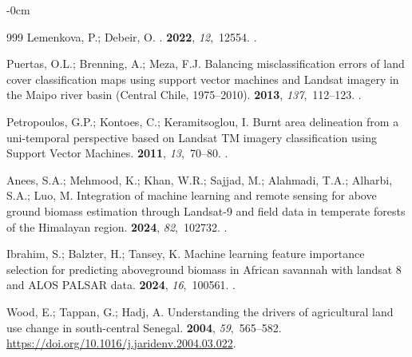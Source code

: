 \documentclass[earth,article,accept,pdftex,moreauthors]{Definitions/mdpi}
\begin{document}
{\begin{adjustwidth}{-\extralength}{0cm}
\begin{thebibliography}{999}
Lemenkova, P.; Debeir, O.
.
 {\bf 2022}, {\em 12},~12554.
.

Puertas, O.L.; Brenning, A.; Meza, F.J.
\newblock Balancing misclassification errors of land cover classification maps
  using support vector machines and Landsat imagery in the Maipo river basin
  (Central Chile, 1975–2010).
 {\bf 2013}, {\em 137},~112--123.
.

Petropoulos, G.P.; Kontoes, C.; Keramitsoglou, I.
\newblock Burnt area delineation from a uni-temporal perspective based on
  Landsat TM imagery classification using Support Vector Machines.
 {\bf 2011}, {\em 13},~70--80.
.

Anees, S.A.; Mehmood, K.; Khan, W.R.; Sajjad, M.; Alahmadi, T.A.; Alharbi,
  S.A.; Luo, M.
\newblock Integration of machine learning and remote sensing for above ground
  biomass estimation through Landsat-9 and field data in temperate forests of
  the Himalayan region.
 {\bf 2024}, {\em 82},~102732.
.

Ibrahim, S.; Balzter, H.; Tansey, K.
\newblock Machine learning feature importance selection for predicting
  aboveground biomass in African savannah with landsat 8 and ALOS PALSAR data.
 {\bf 2024}, {\em
  16},~100561.
.

Wood, E.; Tappan, G.; Hadj, A.
\newblock Understanding the drivers of agricultural land use change in
  south-central Senegal.
 {\bf 2004}, {\em 59},~565--582. %
  {\url{https://doi.org/10.1016/j.jaridenv.2004.03.022}}.


\end{thebibliography}
\end{adjustwidth}}
\end{document}
